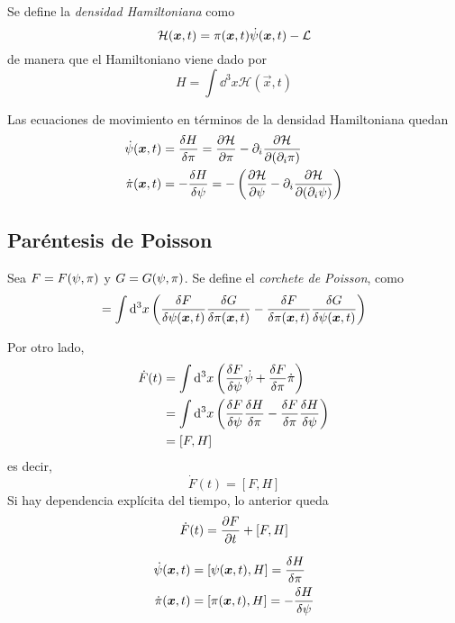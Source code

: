 \begin{defi}
	Se define la \textit{densidad Hamiltoniana} como
	\begin{equation}
  \mathcal{H}(\vb*{x},t)=\pi(\vb*{x},t)\dot{\psi}(\vb*{x},t)-\mathcal{L} 
\end{equation}
de manera que el Hamiltoniano viene dado por
\begin{equation}
  H=\int\dd^3x\mathcal{H}(\vec{x},t)
\end{equation}
\end{defi}
Las ecuaciones de movimiento en términos de la densidad Hamiltoniana quedan
\begin{align}
  \dot{\psi}(\vb*{x},t) &=\frac{\delta H }{\delta\pi }=\pdv{\mathcal{H}}{\pi}-\partial_i\pdv{\mathcal{H}}{(\partial_i\pi )}\\
  \dot{\pi }(\vb*{x},t) &=-\frac{\delta H}{\delta \psi}=-\left(\pdv{\mathcal{H}}{\psi}-\partial_i\pdv{\mathcal{H}}{(\partial_i\psi)}\right)
\end{align}

\subsection{Paréntesis de Poisson}
\begin{defi}
Sea $F=F(\psi,\pi )$ y $G=G(\psi,\pi )$. Se define el \textit{corchete de Poisson}, como
\begin{equation}
  [F,G]=\int\dd^3x\left(\frac{\d F}{\d \psi\xt }\frac{\d G}{\d \p\xt }-\frac{\d F}{\d\p\xt}\frac{\d G}{\d \psi\xt }\right)
\end{equation}
\end{defi}

Por otro lado,
\begin{align}
  \dot{F}(t)&=\int\dd^3x\left(\frac{\delta F}{\delta \psi}\dot{\psi}+\frac{\delta F}{\delta\pi }\dot{\pi }\right)\\
  &=\int\dd^3x\left(\frac{\delta F}{\delta \psi}\frac{\delta H}{\delta \pi}-\frac{\delta F}{\delta \pi}\frac{\delta H}{\delta \psi}\right)\\
  &=[F,H]
\end{align}
es decir,
\begin{equation}
\boxed{  \dot{F}(t)=[F,H]}
\end{equation}
Si hay dependencia explícita del tiempo, lo anterior queda
\begin{equation}
  \dot{F}(t)=\pdv{F}{t}+ [F,H]
\end{equation}

\begin{ej}
	\begin{align}
  \dot{\psi}(\vb*{x},t) &=[\psi(\vb*{x},t) ,H]=\frac{\delta H}{\delta \pi }\label{17.1}\\
  \dot{\pi }(\vb*{x},t) &=[\pi(\vb*{x},t),H]=-\frac{\delta H}{\delta \psi }\label{17.2}
\end{align}
\end{ej}

